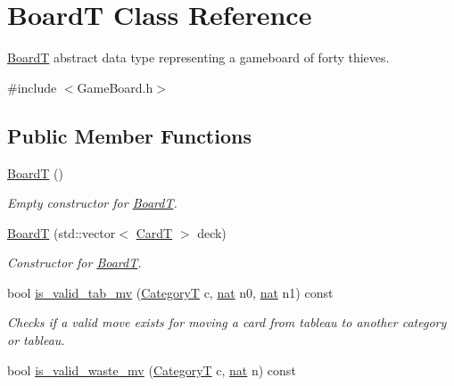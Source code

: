 \hypertarget{class_board_t}{}\section{BoardT Class Reference}
\label{class_board_t}


\hyperlink{class_board_t}{BoardT} abstract data type representing a gameboard of forty thieves.  




{\ttfamily \#include $<$Game\+Board.\+h$>$}

\subsection*{Public Member Functions}
\begin{DoxyCompactItemize}
\item 
\mbox{\label{class_board_t_aa04ccc9d22e66b83d91853f1a9082221}} 
\hyperlink{class_board_t_aa04ccc9d22e66b83d91853f1a9082221}{BoardT} ()
\begin{DoxyCompactList}\small\item\em Empty constructor for \hyperlink{class_board_t}{BoardT}. \end{DoxyCompactList}\item 
\mbox{\label{class_board_t_a4a25fcb5e2e968e11d50bf6c1bb763a1}} 
\hyperlink{class_board_t_a4a25fcb5e2e968e11d50bf6c1bb763a1}{BoardT} (std\+::vector$<$ \hyperlink{struct_card_t}{CardT} $>$ deck)
\begin{DoxyCompactList}\small\item\em Constructor for \hyperlink{class_board_t}{BoardT}. \end{DoxyCompactList}\item 
bool \hyperlink{class_board_t_a0a3ca85b17b45eab0a4c644011e7328a}{is\+\_\+valid\+\_\+tab\+\_\+mv} (\hyperlink{_card_types_8h_aa77f81f8d4c8aa57046a50ca32d6b7b4}{CategoryT} c, \hyperlink{_card_types_8h_a56638ee9d162e8cce3a15f92d2023d6e}{nat} n0, \hyperlink{_card_types_8h_a56638ee9d162e8cce3a15f92d2023d6e}{nat} n1) const
\begin{DoxyCompactList}\small\item\em Checks if a valid move exists for moving a card from tableau to another category or tableau. \end{DoxyCompactList}\item 
bool \hyperlink{class_board_t_ab381818d69a78f502c1aba6b80791f67}{is\+\_\+valid\+\_\+waste\+\_\+mv} (\hyperlink{_card_types_8h_aa77f81f8d4c8aa57046a50ca32d6b7b4}{CategoryT} c, \hyperlink{_card_types_8h_a56638ee9d162e8cce3a15f92d2023d6e}{nat} n) const

\end{DoxyCompactItemize}
